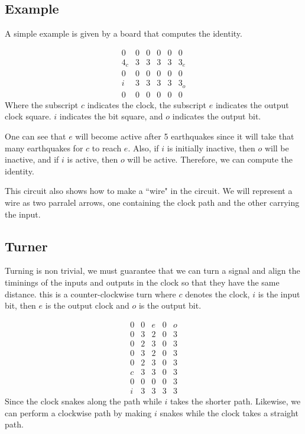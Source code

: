 \documentclass[runningheads,a4paper]{llncs}
\begin{document}
\subsection{Example}

A simple example is given by a board that computes the identity.

\[ \begin{array}{cccccc} 0 & 0 & 0 & 0 & 0 & 0 \\
				     4_c & 3 & 3 & 3 & 3 & 3_e \\
				     0 & 0 & 0 & 0 & 0 & 0 \\
				     i  & 3 & 3 & 3 & 3 & 3_o \\
				     0 & 0 & 0 & 0 & 0 & 0 \end{array} \]
Where the subscript $c$ indicates the clock, the subscript $e$ indicates the output clock square. $i$ indicates the bit square, and $o$ indicates the output bit. 

One can see that $e$ will become active after 5 earthquakes since it will take that many earthquakes for $c$ to reach $e$. Also, if $i$ is initially inactive, then $o$ will be inactive, and if $i$ is active, then $o$ will be active. Therefore, we can compute the identity. 

This circuit also shows how to make a ``wire" in the circuit. We will represent a wire as two parralel arrows, one containing the clock path and the other carrying the input. 

\subsection{Turner}

Turning is non trivial, we must guarantee that we can turn a signal and align the timinings of the inputs and outputs in the clock so that they have the same distance. this is a counter-clockwise turn where $c$ denotes the clock, $i$ is the input bit, then $e$ is the output clock and $o$ is the output bit.

\[ \begin{array}{cccccc} 0 & 0 & e & 0 & o \\
				     0 & 3 & 2 & 0 & 3 \\
			            0 & 2 & 3 & 0 & 3 \\
				    0 & 3 & 2 & 0 & 3 \\
				    0 & 2 & 3 & 0 & 3 \\
				    c & 3 & 3 & 0 & 3 \\
				    0 & 0 & 0 & 0 & 3 \\
				    i & 3 & 3 & 3 & 3 \end{array} \]	
Since the clock snakes along the path while $i$ takes the shorter path. 
Likewise, we can perform a clockwise path by making $i$ snakes while the clock takes a straight path. 
\end{document}
